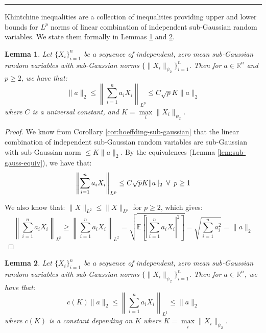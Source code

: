 \documentclass{article}
\newtheorem{lemma}{Lemma}[subsection]
\theoremstyle{remark}
\newcommand{\comprule}{\textcolor[RGB]{220,220,220}{\rule{\linewidth}{0.2pt}}}
\newcommand{\real}{\mathbb{R}}
\newcommand{\Exp}{\mathbb{E}}
\begin{document}
\comprule

Khintchine inequalities are a collection of inequalities providing upper and lower bounds for \(L^{p}\) norms of linear combination of independent sub-Gaussian random variables. We state them formally in Lemmas \ref{lem:khintchine-p-geq-2} and \ref{lem:khintchine-p-1}.

\begin{lemma}
\label{lem:khintchine-p-geq-2}
Let \(\{X_{i}\}_{i=1}^{n}\) be a sequence of independent, zero mean sub-Gaussian random variables with sub-Gaussian norms \(\{\|X_{i}\|_{\psi_{2}}\}_{i=1}^{n}\). Then for \(a \in \real^{n}\) and \(p \geq 2\), we have that:
\begin{equation*}
\|a\|_{2} \leq \left\|\sum_{i=1}^{n} a_{i}X_{i}\right\|_{L^{p}} \leq C\sqrt{p}K\|a\|_{2}
\end{equation*}
where \(C\) is a universal constant, and \(K = \max\limits_{i} \|X_{i}\|_{\psi_{2}}\).
\end{lemma}

\begin{proof}
We know from Corollary \ref{cor:hoeffding-sub-gaussian} that the linear combination of independent sub-Gaussian random variables are sub-Gaussian with sub-Gaussian norm \(\leq K\|a\|_{2}\). By the equivalences (Lemma \ref{lem:sub-gauss-equiv}), we have that:
\begin{equation*}
\left\|\sum_{i=1}^{n} a_{i}X_{i}\right\|_{L^{p}} \leq C \sqrt{p} K\|a\|_{2} \enskip \forall \enskip p \geq 1
\end{equation*}

We also know that: \(\|X\|_{L^{2}} \leq \|X\|_{L^{p}}\) for \(p \geq 2\), which gives:
\begin{equation*}
\left\|\sum_{i=1}^{n} a_{i}X_{i}\right\|_{L^{p}} \geq \left\|\sum_{i=1}^{n} a_{i}X_{i}\right\|_{L^{2}} = \sqrt{\Exp\left[\left|\sum_{i=1}^{n}a_{i}X_{i}\right|^{2}\right]} = \sqrt{\sum_{i=1}^{n}a_{i}^{2}} = \|a\|_{2}
\end{equation*}
\end{proof}

\begin{lemma}
\label{lem:khintchine-p-1}
Let \(\{X_{i}\}_{i=1}^{n}\) be a sequence of independent, zero mean sub-Gaussian random variables with sub-Gaussian norms \(\{\|X_{i}\|_{\psi_{2}}\}_{i=1}^{n}\). Then for \(a \in \real^{n}\), we have that:
\begin{equation*}
c(K)\|a\|_{2} \leq \left\|\sum_{i=1}^{n} a_{i}X_{i}\right\|_{L^{1}} \leq \|a\|_{2}
\end{equation*}
where \(c(K)\) is a constant depending on \(K\) where \(K = \max\limits_{i} \|X_{i}\|_{\psi_{2}}\).
\end{lemma}
\end{document}
